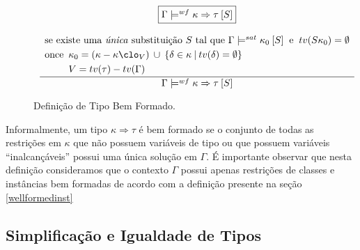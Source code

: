 \begin{figure}[h]
\small{
\[ \begin{array}{c}
       \fbox{$\Gamma\models^{wf} \kappa\Rightarrow\tau\:[S]$} \\ \\
       {\displaystyle \frac{\begin{array}{l}
		                   \text{se existe uma \emph{\'unica} substitui\c{c}\~ao $S$ tal que } \Gamma \models^{sat} \kappa_0\:[S]\:
						   \text{ e }\: tv(S\kappa_0)=\emptyset \\ [.1cm]
						   \text{once} 
						        \begin{array}[t]{l}
						        \kappa_0 = (\kappa - \kappa\clo_V)\: \cup\: \{ \delta \in \kappa\:|\: tv(\delta)=\emptyset\} \\ [.1cm]
						        V=tv(\tau)-tv(\Gamma)
                                \end{array}
					       \end{array}}
                          {\Gamma \models^{wf} \kappa\Rightarrow\tau\:[S]}
		}
	\end{array}
\]}		   
	\caption{Defini\c{c}\~ao de Tipo Bem Formado.}
	\label{wellform}
\end{figure}

Informalmente, um tipo $\kappa\Rightarrow\tau$ \'e bem formado se o conjunto de todas as 
restri\c{c}\~oes em $\kappa$ que n\~ao possuem vari\'aveis de tipo ou que possuem vari\'aveis ``inalcan\c{c}\'aveis''
possui uma \'unica solu\c{c}\~ao em $\Gamma$. \'E importante observar que nesta defini\c{c}\~ao consideramos que o
contexto $\Gamma$ possui apenas restri\c{c}\~oes de classes e inst\^ancias bem formadas de acordo com a defini\c{c}\~ao
presente na se\c{c}\~ao \ref{wellformedinst}

\subsection{Simplifica\c{c}\~ao e Igualdade de Tipos}\label{simpleq}

